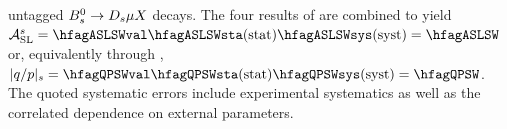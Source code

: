 untagged $B^0_s \to D_s \mu X$ decays.
The four results of  are
combined to yield
$\ASLs = \hfagASLSWval\hfagASLSWsta\mbox{(stat)}\hfagASLSWsys\mbox{(syst)} = \hfagASLSW$
or, equivalently through ,
$|q/p|_{\particle{s}} = \hfagQPSWval\hfagQPSWsta\mbox{(stat)}\hfagQPSWsys\mbox{(syst)} = \hfagQPSW$.
The quoted systematic errors include experimental systematics as well as the correlated dependence on external 
parameters. 

